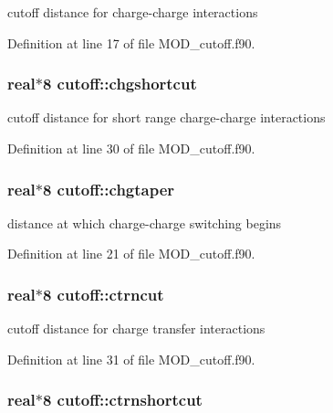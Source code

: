 cutoff distance for charge-\/charge interactions 



Definition at line 17 of file M\-O\-D\-\_\-cutoff.\-f90.

\hypertarget{classcutoff_a405df19c5de05489ea9b130835e7837e}{
\subsubsection[{chgshortcut}]{\setlength{\rightskip}{0pt plus 5cm}real$\ast$8 cutoff\-::chgshortcut}}\label{classcutoff_a405df19c5de05489ea9b130835e7837e}


cutoff distance for short range charge-\/charge interactions 



Definition at line 30 of file M\-O\-D\-\_\-cutoff.\-f90.

\hypertarget{classcutoff_a806d1743b0716c7f476bd199bb829ac5}{
\subsubsection[{chgtaper}]{\setlength{\rightskip}{0pt plus 5cm}real$\ast$8 cutoff\-::chgtaper}}\label{classcutoff_a806d1743b0716c7f476bd199bb829ac5}


distance at which charge-\/charge switching begins 



Definition at line 21 of file M\-O\-D\-\_\-cutoff.\-f90.

\hypertarget{classcutoff_ad5f03f16e01399362bd1106c6780cb71}{
\subsubsection[{ctrncut}]{\setlength{\rightskip}{0pt plus 5cm}real$\ast$8 cutoff\-::ctrncut}}\label{classcutoff_ad5f03f16e01399362bd1106c6780cb71}


cutoff distance for charge transfer interactions 



Definition at line 31 of file M\-O\-D\-\_\-cutoff.\-f90.

\hypertarget{classcutoff_a1fbf47f5127967bd55285825743c33f0}{
\subsubsection[{ctrnshortcut}]{\setlength{\rightskip}{0pt plus 5cm}real$\ast$8 cutoff\-::ctrnshortcut}}\label{classcutoff_a1fbf47f5127967bd55285825743c33f0}


